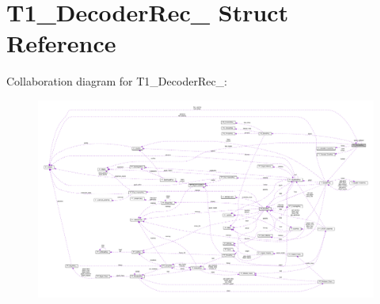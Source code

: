 \hypertarget{structT1__DecoderRec__}{}\section{T1\+\_\+\+Decoder\+Rec\+\_\+ Struct Reference}
\label{structT1__DecoderRec__}


Collaboration diagram for T1\+\_\+\+Decoder\+Rec\+\_\+\+:
\nopagebreak
\begin{figure}[H]
\begin{center}
\leavevmode
\includegraphics[width=350pt]{structT1__DecoderRec____coll__graph}
\end{center}
\end{figure}
